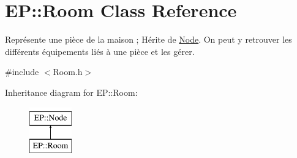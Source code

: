 \hypertarget{class_e_p_1_1_room}{}\section{EP\+:\+:Room Class Reference}
\label{class_e_p_1_1_room}


Représente une pièce de la maison ; Hérite de \hyperlink{class_e_p_1_1_node}{Node}. On peut y retrouver les différents équipements liés à une pièce et les gérer.  




{\ttfamily \#include $<$Room.\+h$>$}

Inheritance diagram for EP\+:\+:Room\+:\begin{figure}[H]
\begin{center}
\leavevmode
\includegraphics[height=2.000000cm]{class_e_p_1_1_room}
\end{center}
\end{figure}
